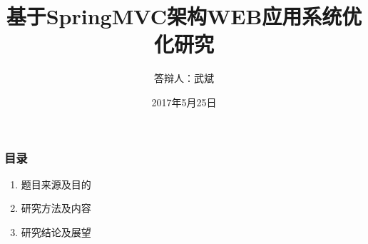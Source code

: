 \documentclass{beamer}
\title{基于SpringMVC架构WEB应用系统优化研究}
\author{答辩人：武斌}
\institute
{
  导师：郑海永\\
  电子系~中国海洋大学
  \and
   Department electronic engineering \\
  Ocean University Of China
}
\date{2017年5月25日}
\begin{document}
\begin{frame}
  \titlepage
\end{frame}

\begin{frame}
  \frametitle{目录}
  \begin{enumerate}
    \item<1-> 题目来源及目的
    \item<1-> 研究方法及内容
    \item<1-> 研究结论及展望
  \end{enumerate}
\end{frame}
\end{document}
